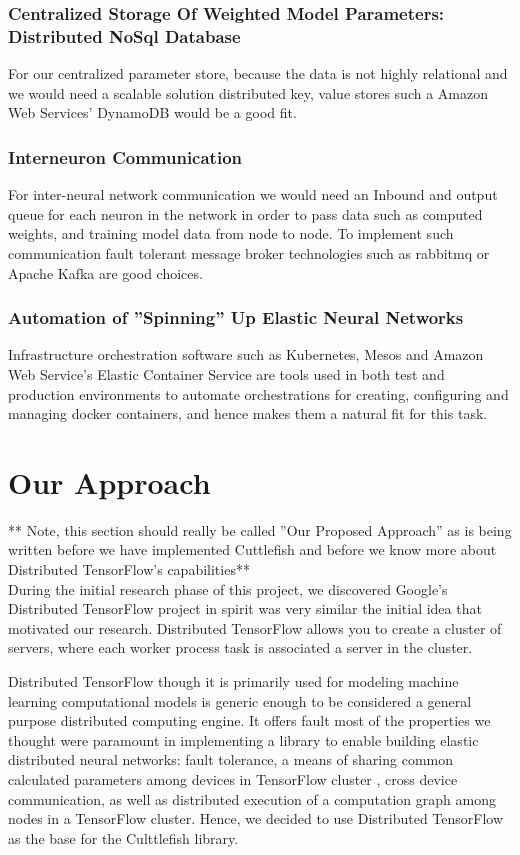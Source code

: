 \documentclass[conference]{IEEEtran}
\begin{document}
\subsubsection{Centralized Storage Of Weighted Model Parameters: Distributed NoSql Database}
For our centralized parameter store, because the data is not highly relational and we would need a scalable solution distributed key, value stores such a Amazon Web Services' DynamoDB would be a good fit.

\subsubsection{Interneuron Communication}
For inter-neural network communication we would need an Inbound and output queue for each neuron in the network in order to pass data such as computed weights, and training model data from node to node. To implement such communication fault tolerant message broker technologies such as rabbitmq \cite{rabbitmq-doc} or Apache Kafka \cite{kafka-doc} are good choices.

\subsubsection{Automation of ''Spinning'' Up Elastic Neural Networks}
Infrastructure orchestration software such as Kubernetes, Mesos and Amazon Web Service's Elastic Container Service are tools used in both test and production environments to automate orchestrations for creating, configuring and managing docker containers, and hence makes them a natural fit for this task.

\section{Our Approach}

** Note, this section should really be called ''Our Proposed Approach'' as is being written before we have implemented Cuttlefish and before we know more about Distributed TensorFlow's capabilities**\\

During the initial research phase of this project, we discovered Google's Distributed TensorFlow project in spirit was very similar the initial idea that motivated our research.  Distributed TensorFlow allows you to create a cluster of servers, where each worker process task is associated a server in the cluster.

Distributed TensorFlow though it is primarily used for modeling machine learning computational models is generic enough to be considered a general purpose distributed computing engine. It offers fault most of the properties we thought were paramount in implementing a library to enable building elastic distributed neural networks: fault  tolerance, a means of sharing common calculated parameters among devices in TensorFlow cluster \cite{dist-tensorflow}, cross device communication, as well as distributed execution of a computation graph among nodes in a TensorFlow cluster.  Hence, we decided to use Distributed TensorFlow as the base for the Culttlefish library.
\end{document}
